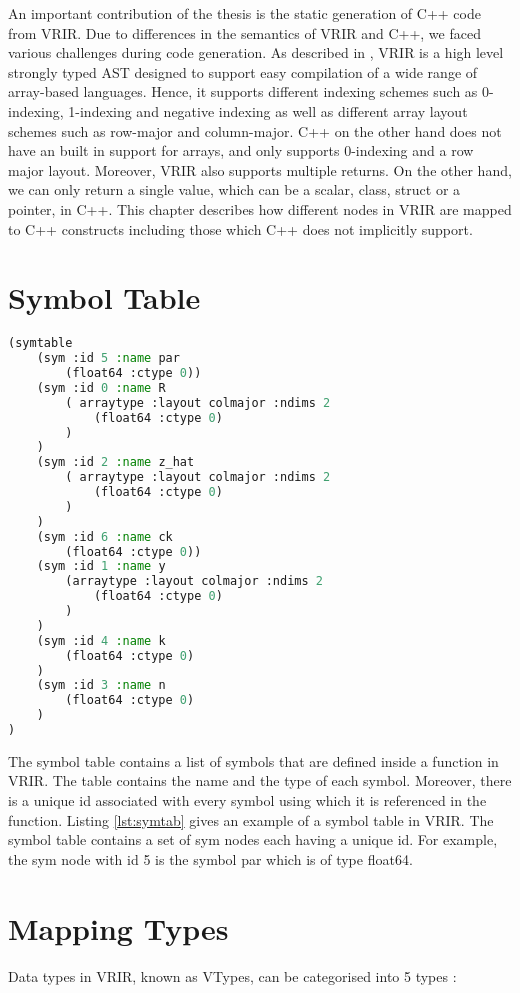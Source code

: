 An important contribution of the thesis is the static generation of C++ code from VRIR. Due to differences in the semantics of VRIR and C++, we faced various challenges during code generation. As described in , VRIR is a high level strongly typed AST designed to support easy compilation of a wide range of array-based languages. Hence, it supports different indexing schemes such as 0-indexing, 1-indexing and negative indexing as well as different array layout schemes such as row-major and column-major. C++ on the other hand does not have an built in support for arrays, and only supports 0-indexing and a row major layout. Moreover, VRIR also supports multiple returns. On the other hand, we can only return a single value, which can be a scalar, class, struct or a pointer, in C++. This chapter describes how different nodes in VRIR are mapped to C++ constructs including those which C++ does not implicitly support.
\section{Symbol Table}
\begin{lstlisting}[float,language=lisp, label={lst:symtab}, caption={Symbol table in VRIR}]
(symtable
	(sym :id 5 :name par 
		(float64 :ctype 0)) 
	(sym :id 0 :name R 
		( arraytype :layout colmajor :ndims 2
			(float64 :ctype 0)
		)
	) 
	(sym :id 2 :name z_hat 
		( arraytype :layout colmajor :ndims 2
			(float64 :ctype 0)
		)
	) 
	(sym :id 6 :name ck 
		(float64 :ctype 0)) 
	(sym :id 1 :name y 
		(arraytype :layout colmajor :ndims 2
			(float64 :ctype 0)
		)
	) 
	(sym :id 4 :name k 
		(float64 :ctype 0)
	) 
	(sym :id 3 :name n 
		(float64 :ctype 0)
	) 
)
\end{lstlisting}
The symbol table contains a list of symbols that are defined inside a function in VRIR. The table contains the name and the type of each symbol. Moreover, there is a unique id associated with every symbol using which it is referenced in the function. Listing \ref{lst:symtab} gives an example of a symbol table in VRIR. The symbol table contains a set of sym nodes each having a unique id. For example, the sym node with id 5 is the symbol par which is of type float64.
\section{Mapping Types}
Data types in VRIR, known as VTypes, can be categorised into 5 types :
